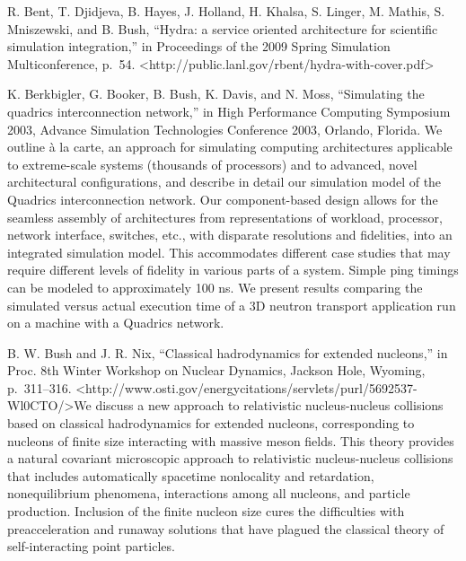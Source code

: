 \documentclass[]{article}
\begin{document}
R. Bent, T. Djidjeva, B. Hayes, J. Holland, H. Khalsa, S. Linger, M.
Mathis, S. Mniszewski, and B. Bush, ``Hydra: a service oriented
architecture for scientific simulation integration,'' in Proceedings of
the 2009 Spring Simulation Multiconference, p.~54.
\textless{}http://public.lanl.gov/rbent/hydra-with-cover.pdf\textgreater{}

K. Berkbigler, G. Booker, B. Bush, K. Davis, and N. Moss, ``Simulating
the quadrics interconnection network,'' in High Performance Computing
Symposium 2003, Advance Simulation Technologies Conference 2003,
Orlando, Florida. We outline à la carte, an approach for simulating
computing architectures applicable to extreme-scale systems (thousands
of processors) and to advanced, novel architectural configurations, and
describe in detail our simulation model of the Quadrics interconnection
network. Our component-based design allows for the seamless assembly of
architectures from representations of workload, processor, network
interface, switches, etc., with disparate resolutions and fidelities,
into an integrated simulation model. This accommodates different case
studies that may require different levels of fidelity in various parts
of a system. Simple ping timings can be modeled to approximately 100 ns.
We present results comparing the simulated versus actual execution time
of a 3D neutron transport application run on a machine with a Quadrics
network.

B. W. Bush and J. R. Nix, ``Classical hadrodynamics for extended
nucleons,'' in Proc. 8th Winter Workshop on Nuclear Dynamics, Jackson
Hole, Wyoming, p.~311--316.
\textless{}http://www.osti.gov/energycitations/servlets/purl/5692537-Wl0CTO/\textgreater{}We
discuss a new approach to relativistic nucleus-nucleus collisions based
on classical hadrodynamics for extended nucleons, corresponding to
nucleons of finite size interacting with massive meson fields. This
theory provides a natural covariant microscopic approach to relativistic
nucleus-nucleus collisions that includes automatically spacetime
nonlocality and retardation, nonequilibrium phenomena, interactions
among all nucleons, and particle production. Inclusion of the finite
nucleon size cures the difficulties with preacceleration and runaway
solutions that have plagued the classical theory of self-interacting
point particles.
\end{document}
